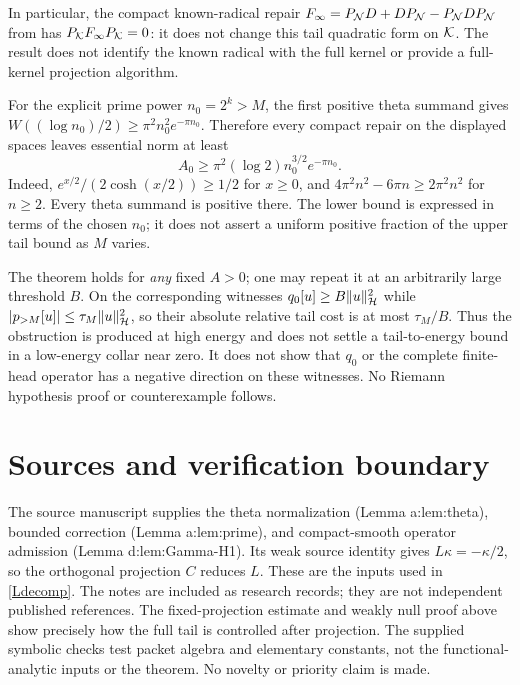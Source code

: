\documentclass[11pt]{article}
\begin{document}
In particular, the compact known-radical repair $F_\infty=P_\mathcal N D+DP_\mathcal N-P_\mathcal N DP_\mathcal N$ from \cite{repairnote} has $P_\mathcal K F_\infty P_\mathcal K=0$: it does not change this tail quadratic form on $\mathcal K$. The result does not identify the known radical with the full kernel or provide a full-kernel projection algorithm.

For the explicit prime power $n_0=2^k>M$, the first positive theta summand gives $W((\log n_0)/2)\ge\pi^2n_0^2e^{-\pi n_0}$. Therefore every compact repair on the displayed spaces leaves essential norm at least
\begin{equation}\label{explicit}
 A_0\ge\pi^2(\log2)n_0^{3/2}e^{-\pi n_0}.
\end{equation}
Indeed, $e^{x/2}/(2\cosh(x/2))\ge1/2$ for $x\ge0$, and $4\pi^2n^2-6\pi n\ge2\pi^2n^2$ for $n\ge2$. Every theta summand is positive there. The lower bound is expressed in terms of the chosen $n_0$; it does not assert a uniform positive fraction of the upper tail bound as $M$ varies.

The theorem holds for \emph{any} fixed $A>0$; one may repeat it at an arbitrarily large threshold $B$. On the corresponding witnesses $q_0[u]\ge B\lVert u\rVert_{\mathcal H}^2$ while $|p_{>M}[u]|\le\tau_M\lVert u\rVert_{\mathcal H}^2$, so their absolute relative tail cost is at most $\tau_M/B$. Thus the obstruction is produced at high energy and does not settle a tail-to-energy bound in a low-energy collar near zero. It does not show that $q_0$ or the complete finite-head operator has a negative direction on these witnesses. No Riemann hypothesis proof or counterexample follows.

\section{Sources and verification boundary}
The source manuscript \cite{source} supplies the theta normalization (Lemma a:lem:theta), bounded correction (Lemma a:lem:prime), and compact-smooth operator admission (Lemma d:lem:Gamma-H1). Its weak source identity gives $L\kappa=-\kappa/2$, so the orthogonal projection $C$ reduces $L$. These are the inputs used in \eqref{Ldecomp}. The notes \cite{tailnote,modulationnote,indexnote,repairnote} are included as research records; they are not independent published references. The fixed-projection estimate and weakly null proof above show precisely how the full tail is controlled after projection. The supplied symbolic checks test packet algebra and elementary constants, not the functional-analytic inputs or the theorem. No novelty or priority claim is made.
\end{document}
